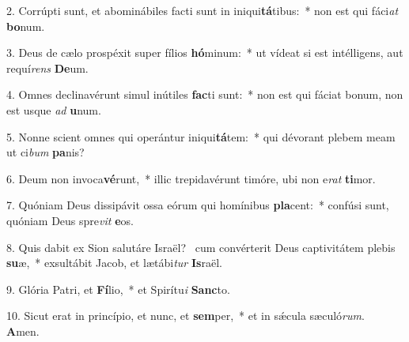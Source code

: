 2. Corrúpti sunt, et abominábiles facti sunt in iniqui\textbf{tá}tibus:~*  non est qui fáci\textit{at} \textbf{bo}num.\

3. Deus de cælo prospéxit super fílios \textbf{hó}minum:~*  ut vídeat si est intélligens, aut requí\textit{rens} \textbf{De}um.\

4. Omnes declinavérunt simul inútiles \textbf{fac}ti sunt:~*  non est qui fáciat bonum, non est usque \textit{ad} \textbf{u}num.\

5. Nonne scient omnes qui operántur iniqui\textbf{tá}tem:~*  qui dévorant plebem meam ut ci\textit{bum} \textbf{pa}nis?\

6. Deum non invoca\textbf{vé}runt,~*  illic trepidavérunt timóre, ubi non e\textit{rat} \textbf{ti}mor.\

7. Quóniam Deus dissipávit ossa eórum qui homínibus \textbf{pla}cent:~*  confúsi sunt, quóniam Deus spre\textit{vit} \textbf{e}os.\

8. Quis dabit ex Sion salutáre Israël? \dag\  cum convérterit Deus captivitátem plebis \textbf{su}æ,~*  exsultábit Jacob, et lætábi\textit{tur} \textbf{Is}raël.\

9. Glória Patri, et \textbf{Fí}lio,~*  et Spirítu\textit{i} \textbf{Sanc}to.\

10. Sicut erat in princípio, et nunc, et \textbf{sem}per,~*  et in sǽcula sæculó\textit{rum}. \textbf{A}men.\

